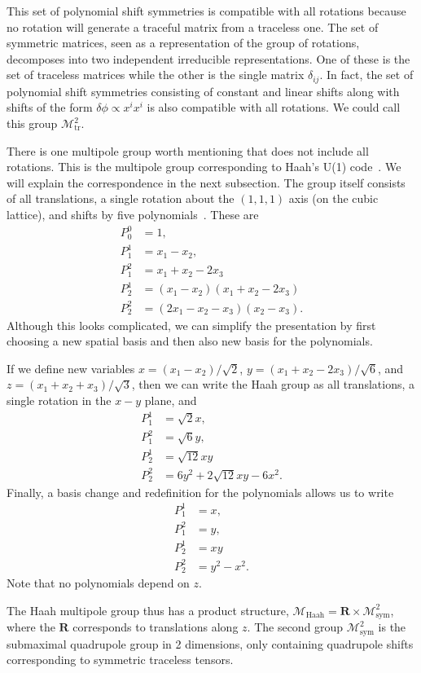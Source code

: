 \documentclass[prb,aps,twocolumn, amsfonts,amsmath,amssymb,nofootinbib,superscriptaddress]{revtex4-2}
\newcommand{\nn}{\nonumber\\}
\begin{document}
This set of polynomial shift symmetries is compatible with all rotations because no rotation will generate a traceful matrix from a traceless one. The set of symmetric matrices, seen as a representation of the group of rotations, decomposes into two independent irreducible representations. One of these is the set of traceless matrices while the other is the single matrix $\delta_{ij}$. In fact, the set of polynomial shift symmetries consisting of constant and linear shifts along with shifts of the form $\delta \phi \propto x^ix^i$ is also compatible with all rotations. We could call this group $\mathcal{M}^2_\text{tr}$.

There is one multipole group worth mentioning that does not include all rotations. This is the multipole group corresponding to Haah's U(1) code~\cite{Haah2017, BB, Gromov2019}. We will explain the correspondence in the next subsection. The group itself consists of all translations, a single rotation about the $(1,1,1)$ axis (on the cubic lattice), and shifts by five polynomials~\cite{Gromov2019}. These are
\begin{align}
P_0^0 &= 1, \nn
P_1^1 &= x_1 - x_2,\nn
P_1^2 &= x_1 + x_2 - 2x_3\nn
P_2^1 &= (x_1 - x_2) (x_1 + x_2 - 2x_3)\nn
P_2^2 &= (2x_1 - x_2 - x_3) (x_2 - x_3).
\end{align}
Although this looks complicated, we can simplify the presentation by first choosing a new spatial basis and then also new basis for the polynomials.

If we define new variables $x = (x_1 - x_2)/\sqrt{2}$, $y = (x_1 + x_2 - 2x_3)/\sqrt{6}$, and $z = (x_1 + x_2 + x_3)/\sqrt{3}$, then we can write the Haah group as all translations, a single rotation in the $x-y$ plane, and
\begin{align}
P_1^1 &= \sqrt{2} x , \nn
P_1^2 &= \sqrt{6} y, \nn
P_2^1 &= \sqrt{12} xy\nn
P_2^2 &= 6y^2 +2\sqrt{12} xy - 6x^2.
\end{align}
Finally, a basis change and redefinition for the polynomials allows us to write
\begin{align}
P_1^1 &= x , \nn
P_1^2 &= y, \nn
P_2^1 &= xy\nn
P_2^2 &= y^2 - x^2.
\end{align}
Note that no polynomials depend on $z$.

The Haah multipole group thus has a product structure, $\mathcal{M}_\text{Haah} = \mathbf{R} \times \mathcal{M}^2_\text{sym}$, where the $\mathbf{R}$ corresponds to translations along $z$. The second group $\mathcal{M}^2_\text{sym}$ is the submaximal quadrupole group in 2 dimensions, only containing quadrupole shifts corresponding to symmetric traceless tensors.
\end{document}
